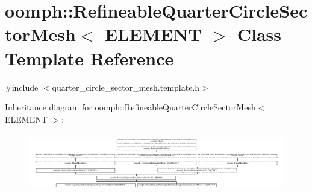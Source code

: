 \hypertarget{classoomph_1_1RefineableQuarterCircleSectorMesh}{}\section{oomph\+:\+:Refineable\+Quarter\+Circle\+Sector\+Mesh$<$ E\+L\+E\+M\+E\+NT $>$ Class Template Reference}
\label{classoomph_1_1RefineableQuarterCircleSectorMesh}


{\ttfamily \#include $<$quarter\+\_\+circle\+\_\+sector\+\_\+mesh.\+template.\+h$>$}

Inheritance diagram for oomph\+:\+:Refineable\+Quarter\+Circle\+Sector\+Mesh$<$ E\+L\+E\+M\+E\+NT $>$\+:\begin{figure}[H]
\begin{center}
\leavevmode
\includegraphics[height=2.608117cm]{classoomph_1_1RefineableQuarterCircleSectorMesh}
\end{center}
\end{figure}
